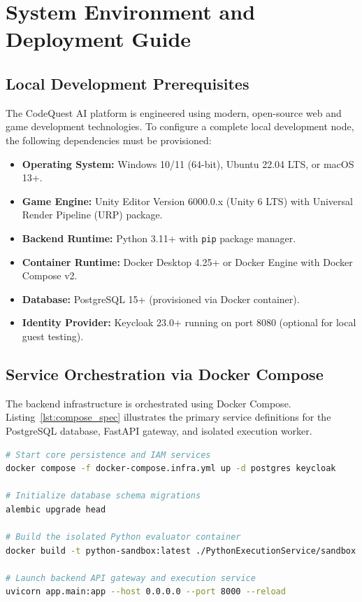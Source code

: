 \appendix
\chapter{System Environment and Deployment Guide}

\section{Local Development Prerequisites}
The CodeQuest AI platform is engineered using modern, open-source web and game development technologies. To configure a complete local development node, the following dependencies must be provisioned:

\begin{itemize}
    \item \textbf{Operating System:} Windows 10/11 (64-bit), Ubuntu 22.04 LTS, or macOS 13+.
    \item \textbf{Game Engine:} Unity Editor Version 6000.0.x (Unity 6 LTS) with Universal Render Pipeline (URP) package.
    \item \textbf{Backend Runtime:} Python 3.11+ with \texttt{pip} package manager.
    \item \textbf{Container Runtime:} Docker Desktop 4.25+ or Docker Engine with Docker Compose v2.
    \item \textbf{Database:} PostgreSQL 15+ (provisioned via Docker container).
    \item \textbf{Identity Provider:} Keycloak 23.0+ running on port 8080 (optional for local guest testing).
\end{itemize}

\section{Service Orchestration via Docker Compose}
The backend infrastructure is orchestrated using Docker Compose. Listing~\ref{lst:compose_spec} illustrates the primary service definitions for the PostgreSQL database, FastAPI gateway, and isolated execution worker.

\begin{lstlisting}[language=bash, caption={Docker Compose Service Configuration}, label={lst:compose_spec}]
# Start core persistence and IAM services
docker compose -f docker-compose.infra.yml up -d postgres keycloak

# Initialize database schema migrations
alembic upgrade head

# Build the isolated Python evaluator container
docker build -t python-sandbox:latest ./PythonExecutionService/sandbox

# Launch backend API gateway and execution service
uvicorn app.main:app --host 0.0.0.0 --port 8000 --reload
\end{lstlisting}

